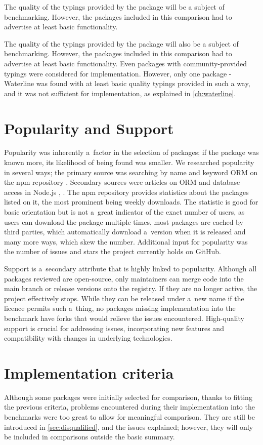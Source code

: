 The quality of the typings provided by the package will be a subject of
benchmarking. However, the packages included in this comparison had to advertise
at least basic functionality.

The quality of the typings provided by the package will also be a subject of
benchmarking. However, the packages included in this comparison had to advertise
at least basic functionality. Even packages with community-provided typings were
considered for implementation. However, only one package - Waterline was found
with at least basic quality typings provided in such a way, and it was not
sufficient for implementation, as explained in \autoref{ch:waterline}.

\section{Popularity and Support}
Popularity was inherently a~factor in the selection of packages; if the package
was known more, its likelihood of being found was smaller. We researched
popularity in several ways; the primary source was searching by name and keyword
ORM on the npm repository \cite{npmSearchORM}. Secondary sources were articles
on ORM and database access in Node.js \cite{SitePoint_2021}, \cite{Wang_2020}.
The npm repository provides statistics about the packages listed on it, the most
prominent being weekly downloads. The statistic is good for basic orientation
but is not a~great indicator of the exact number of users, as users can download
the package multiple times, most packages are cached by third parties, which
automatically download a~version when it is released and many more ways, which
skew the number. Additional input for popularity was the number of issues and
stars the project currently holds on GitHub.

Support is a~secondary attribute that is highly linked to popularity. Although
all packages reviewed are open-source, only maintainers can merge code into the
main branch or release versions onto the registry. If they are no longer active,
the project effectively stops. While they can be released under a~new name if
the licence permits such a~thing, no packages missing implementation into the
benchmark have forks that would relieve the issues encountered. High-quality
support is crucial for addressing issues, incorporating new features and
compatibility with changes in underlying technologies.

\section{Implementation criteria}
Although some packages were initially selected for comparison, thanks to fitting
the previous criteria, problems encountered during their implementation into the
benchmarks were too great to allow for meaningful comparison. They are still be
introduced in \autoref{sec:disqualified}, and the issues explained; however,
they will only be included in comparisons outside the basic summary.



